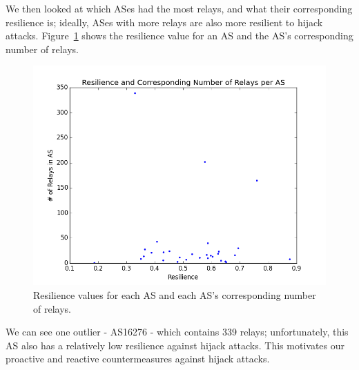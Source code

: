 We then looked at which ASes had the most relays, and what their corresponding resilience is; ideally, ASes with more relays are also more resilient to hijack attacks.  Figure~\ref{fig:res_relays} shows the resilience value for an AS and the AS's corresponding number of relays.  

\begin{figure}
\centering
\includegraphics[width=.5\textwidth]{res_num_relays}
\caption{Resilience values for each AS and each AS's corresponding number of relays.}
\label{fig:res_relays}
\end{figure}

We can see one outlier - AS16276 - which contains 339 relays; unfortunately, this AS also has a relatively low resilience against hijack attacks.  This motivates our proactive and reactive countermeasures against hijack attacks.
